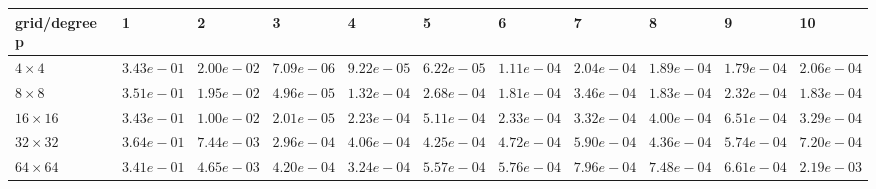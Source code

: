 \begin{tabular}{lllllllllll}
\hline
 grid/degree p   & 1          & 2          & 3          & 4          & 5          & 6          & 7          & 8          & 9          & 10         \\
\hline
 $4 \times 4$    & $3.43e-01$ & $2.00e-02$ & $7.09e-06$ & $9.22e-05$ & $6.22e-05$ & $1.11e-04$ & $2.04e-04$ & $1.89e-04$ & $1.79e-04$ & $2.06e-04$ \\
 $8 \times 8$    & $3.51e-01$ & $1.95e-02$ & $4.96e-05$ & $1.32e-04$ & $2.68e-04$ & $1.81e-04$ & $3.46e-04$ & $1.83e-04$ & $2.32e-04$ & $1.83e-04$ \\
 $16 \times 16$  & $3.43e-01$ & $1.00e-02$ & $2.01e-05$ & $2.23e-04$ & $5.11e-04$ & $2.33e-04$ & $3.32e-04$ & $4.00e-04$ & $6.51e-04$ & $3.29e-04$ \\
 $32 \times 32$  & $3.64e-01$ & $7.44e-03$ & $2.96e-04$ & $4.06e-04$ & $4.25e-04$ & $4.72e-04$ & $5.90e-04$ & $4.36e-04$ & $5.74e-04$ & $7.20e-04$ \\
 $64 \times 64$  & $3.41e-01$ & $4.65e-03$ & $4.20e-04$ & $3.24e-04$ & $5.57e-04$ & $5.76e-04$ & $7.96e-04$ & $7.48e-04$ & $6.61e-04$ & $2.19e-03$ \\
\hline
\end{tabular}